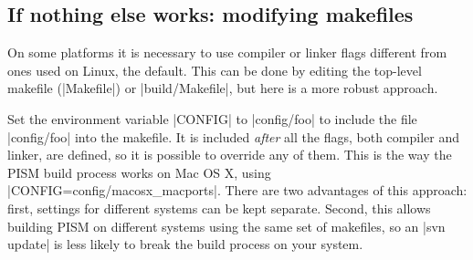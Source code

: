 \documentclass[11pt,final]{amsart}
\begin{document}
\clearpage
\subsection{If nothing else works: modifying makefiles}
\label{subsec:config}

On some platforms it is necessary to use compiler or linker flags different from ones used on
Linux, the default.  This can be done by editing the top-level makefile (|Makefile|) or |build/Makefile|, but here is a more robust approach.

Set the environment variable |CONFIG| to |config/foo| to include the file |config/foo| into the makefile.  It is included \emph{after} all the flags, both compiler and linker, are defined, so it is possible to override any of them.   This is the way the PISM build process works on Mac OS X, using |CONFIG=config/macosx_macports|.  There are two advantages of this approach: first, settings for different systems can be kept separate.  Second, this allows building PISM on different systems using the same set of makefiles, so an |svn update| is less likely to break the build process on your system.



\clearpage
\end{document}

